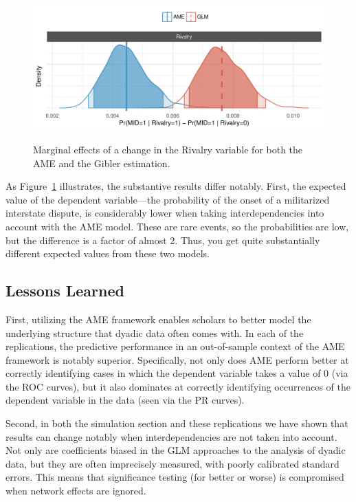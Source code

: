 \begin{figure}
	\caption{Marginal effects of a change in the Rivalry variable for both the AME and the Gibler estimation.  \label{fig:gibmargeff}}
	\includegraphics[width=\textwidth]{graphics/gibler_margeff.pdf}
 	\label{fig:gibmargeff}
 \end{figure}

As Figure~\ref{fig:gibmargeff} illustrates, the substantive results differ notably. First, the expected value of the dependent variable---the probability of the onset of a militarized interstate dispute, is considerably lower when taking interdependencies into account with the AME model.  These are rare events, so the probabilities are low, but the difference is a factor of almost 2. Thus, you get quite substantially different expected values from these two models.  

\subsection{Lessons Learned}

First, utilizing the AME framework enables scholars to better model the underlying structure that dyadic data often comes with. In each of the replications, the predictive performance in an out-of-sample context of the AME framework is notably superior. Specifically, not only does AME perform better at correctly identifying cases in which the dependent variable takes a value of $0$ (via the ROC curves), but it also dominates at correctly identifying occurrences of the dependent variable in the data (seen via the PR curves). 

Second, in both the simulation section and these replications we have shown that results can change notably when interdependencies are not taken into account. Not only are coefficients biased in the GLM approaches to the analysis of dyadic data, but they are often imprecisely measured, with poorly calibrated standard errors.  This means that significance testing (for better or worse) is compromised when network effects are ignored.

